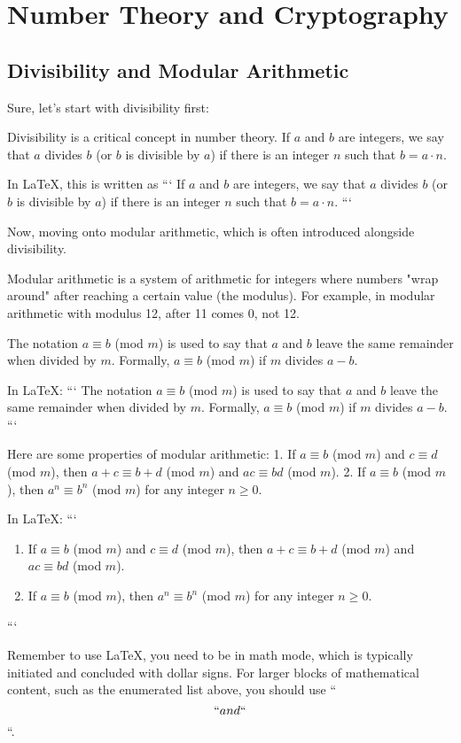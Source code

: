 \section{Number Theory and Cryptography}
\subsection{Divisibility and Modular Arithmetic}
Sure, let's start with divisibility first:

Divisibility is a critical concept in number theory. If $a$ and $b$ are integers, we say that $a$ divides $b$ (or $b$ is divisible by $a$) if there is an integer $n$ such that $b = a \cdot n$. 

In LaTeX, this is written as
```
If $a$ and $b$ are integers, we say that $a$ divides $b$ (or $b$ is divisible by $a$) if there is an integer $n$ such that $b = a \cdot n$.
```

Now, moving onto modular arithmetic, which is often introduced alongside divisibility.

Modular arithmetic is a system of arithmetic for integers where numbers "wrap around" after reaching a certain value (the modulus). For example, in modular arithmetic with modulus 12, after 11 comes 0, not 12.

The notation $a \equiv b$ (mod $m$) is used to say that $a$ and $b$ leave the same remainder when divided by $m$. Formally, $a \equiv b$ (mod $m$) if $m$ divides $a - b$.

In LaTeX:
```
The notation $a \equiv b$ (mod $m$) is used to say that $a$ and $b$ leave the same remainder when divided by $m$. Formally, $a \equiv b$ (mod $m$) if $m$ divides $a - b$.
```

Here are some properties of modular arithmetic:
1. If $a \equiv b$ (mod $m$) and $c \equiv d$ (mod $m$), then $a+c \equiv b+d$ (mod $m$) and $ac \equiv bd$ (mod $m$).
2. If $a \equiv b$ (mod $m$), then $a^n \equiv b^n$ (mod $m$) for any integer $n \ge 0$.

In LaTeX:
```
\begin{enumerate}
\item If $a \equiv b$ (mod $m$) and $c \equiv d$ (mod $m$), then $a+c \equiv b+d$ (mod $m$) and $ac \equiv bd$ (mod $m$).
\item If $a \equiv b$ (mod $m$), then $a^n \equiv b^n$ (mod $m$) for any integer $n \ge 0$.
\end{enumerate}
```

Remember to use LaTeX, you need to be in math mode, which is typically initiated and concluded with dollar signs. For larger blocks of mathematical content, such as the enumerated list above, you should use ``\begin{equation}`` and ``\end{equation}``.

